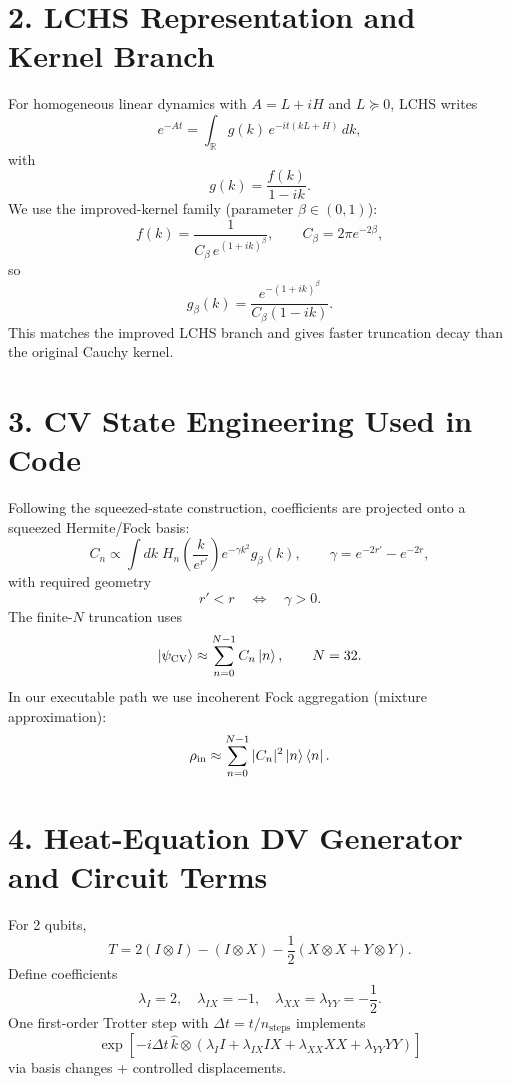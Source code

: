 \documentclass[11pt]{article}
\begin{document}
\section*{2. LCHS Representation and Kernel Branch}
For homogeneous linear dynamics with $A=L+iH$ and $L\succeq 0$, LCHS writes
\begin{equation}
 e^{-At} = \int_{\mathbb R} g(k)\,e^{-it(kL+H)}\,dk,
\end{equation}
with
\begin{equation}
 g(k)=\frac{f(k)}{1-ik}.
\end{equation}
We use the improved-kernel family (parameter $\beta\in(0,1)$):
\begin{equation}
 f(k)=\frac{1}{C_\beta\,e^{(1+ik)^\beta}},\qquad C_\beta=2\pi e^{-2\beta},
\end{equation}
so
\begin{equation}
 g_\beta(k)=\frac{e^{-(1+ik)^\beta}}{C_\beta(1-ik)}.
\end{equation}
This matches the improved LCHS branch and gives faster truncation decay than the original Cauchy kernel.

\section*{3. CV State Engineering Used in Code}
Following the squeezed-state construction, coefficients are projected onto a squeezed Hermite/Fock basis:
\begin{equation}
C_n\propto \int dk\; H_n\!\left(\frac{k}{e^{r'}}\right)e^{-\gamma k^2}g_\beta(k),
\qquad \gamma=e^{-2r'}-e^{-2r},
\end{equation}
with required geometry
\begin{equation}
r'<r\quad\Longleftrightarrow\quad\gamma>0.
\end{equation}
The finite-$N$ truncation uses
\begin{equation}
\ket{\psi_{\mathrm{CV}}}\approx\sum_{n=0}^{N-1}C_n\ket{n},\qquad N=32.
\end{equation}
In our executable path we use incoherent Fock aggregation (mixture approximation):
\begin{equation}
\rho_{\mathrm{in}}\approx\sum_{n=0}^{N-1}|C_n|^2\ket n\bra n.
\end{equation}

\section*{4. Heat-Equation DV Generator and Circuit Terms}
For 2 qubits,
\begin{equation}
T=2(I\otimes I)-(I\otimes X)-\frac{1}{2}(X\otimes X+Y\otimes Y).
\end{equation}
Define coefficients
\begin{equation}
\lambda_I=2,\quad \lambda_{IX}=-1,\quad \lambda_{XX}=\lambda_{YY}=-\frac12.
\end{equation}
One first-order Trotter step with $\Delta t=t/n_{\text{steps}}$ implements
\begin{equation}
\exp[-i\Delta t\,\hat{k}\otimes (\lambda_I I + \lambda_{IX}IX + \lambda_{XX}XX + \lambda_{YY}YY)]
\end{equation}
via basis changes + controlled displacements.
\end{document}
